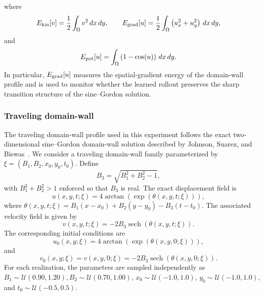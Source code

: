 \documentclass[11pt,a4paper]{article}
\DeclareMathOperator{\sech}{sech}
\theoremstyle{definition}
\theoremstyle{remark}
\numberwithin{equation}{section}
\numberwithin{figure}{section}
\numberwithin{table}{section}
\begin{document}
where
\begin{equation}
    E_{\rm kin}[v]
    =
    \frac12\int_{\Omega} v^2\,dx\,dy,
    \qquad
    E_{\rm grad}[u]
    =
    \frac12\int_{\Omega}
    \left(u_x^2+u_y^2\right)\,dx\,dy,
    \label{eq:sg_kinetic_gradient_energy}
\end{equation}
and
\begin{equation}
    E_{\rm pot}[u]
    =
    \int_{\Omega}
    \left(1-\cos(u)\right)\,dx\,dy .
    \label{eq:sg_potential_energy}
\end{equation}
In particular, \(E_{\rm grad}[u]\) measures the spatial-gradient energy of the
domain-wall profile and is used to monitor whether the learned rollout preserves
the sharp transition structure of the sine--Gordon solution.


\subsubsection*{Traveling domain-wall}
The traveling domain-wall profile used in this experiment follows the exact two-dimensional sine--Gordon domain-wall solution described by Johnson, Suarez, and Biswas~\cite{johnson2012new}.
We consider a traveling domain-wall family parameterized by
\(\xi=(B_1,B_2,x_0,y_0,t_0)\). Define
\[
    B_3=\sqrt{B_1^2+B_2^2-1},
\]
with \(B_1^2+B_2^2>1\) enforced so that \(B_3\) is real. The exact displacement field is
\begin{equation}
    u(x,y,t;\xi)
    =
    4\arctan\!\left(\exp(\theta(x,y,t;\xi))\right),
    \label{eq:sg_2d_exact_solution}
\end{equation}
where $ \theta(x,y,t;\xi)= B_1(x-x_0)+B_2(y-y_0)-B_3(t-t_0).$ The associated velocity field is given by
\begin{equation}
    v(x,y,t;\xi)
    =
    -2B_3\sech(\theta(x,y,t;\xi)).
    \label{eq:sg_2d_exact_velocity}
\end{equation}
The corresponding initial conditions are
\begin{equation}
    u_0(x,y;\xi)
    =
    4\arctan\!\left(\exp(\theta(x,y,0;\xi))\right),
    \label{eq:sg_2d_initial_displacement}
\end{equation}
and
\begin{equation}
    v_0(x,y;\xi)
    =
    v(x,y,0;\xi)
    =
    -2B_3\sech(\theta(x,y,0;\xi)).
    \label{eq:sg_2d_initial_velocity}
\end{equation}
For each realization, the parameters are sampled independently as $B_1\sim\mathcal U(0.90,1.20), B_2\sim\mathcal U(0.70,1.00),\, x_0\sim\mathcal U(-1.0,1.0),\, y_0\sim\mathcal U(-1.0,1.0),$ and $t_0\sim\mathcal U(-0.5,0.5).$ 
\end{document}
